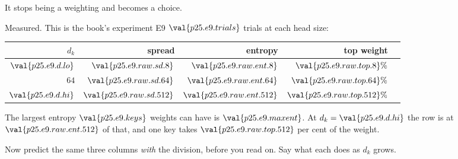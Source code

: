 \begin{fr}
\begin{ansblock}
It stops being a weighting and becomes a choice.
\end{ansblock}

Measured. This is the book's experiment E9 \dash{} $\val{p25.e9.trials}$
trials at each head size:

\begin{center}
\begin{tabular}{rrrrr}
\toprule
$d_k$ & spread & entropy & top weight & \\
\midrule
$\val{p25.e9.d.lo}$ & $\val{p25.e9.raw.sd.8}$ & $\val{p25.e9.raw.ent.8}$ &
  $\val{p25.e9.raw.top.8}\%$ & \\
$64$ & $\val{p25.e9.raw.sd.64}$ & $\val{p25.e9.raw.ent.64}$ &
  $\val{p25.e9.raw.top.64}\%$ & \\
$\val{p25.e9.d.hi}$ & $\val{p25.e9.raw.sd.512}$ &
  $\val{p25.e9.raw.ent.512}$ & $\val{p25.e9.raw.top.512}\%$ & \\
\bottomrule
\end{tabular}
\end{center}

The largest entropy $\val{p25.e9.keys}$ weights can have is
$\val{p25.e9.maxent}$. At $d_k = \val{p25.e9.d.hi}$ the row is at
$\val{p25.e9.raw.ent.512}$ of that, and one key takes
$\val{p25.e9.raw.top.512}$ per cent of the weight.

Now predict the same three columns \emph{with} the division, before you
read on. Say what each does as $d_k$ grows.
\dotline
\nextframe
\end{fr}

